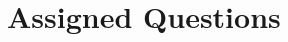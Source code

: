 \documentclass[12pt, oneside]{article}
\begin{document}
\section*{Assigned Questions}
\begin{enumerate}








  

\end{enumerate}
\end{document}

